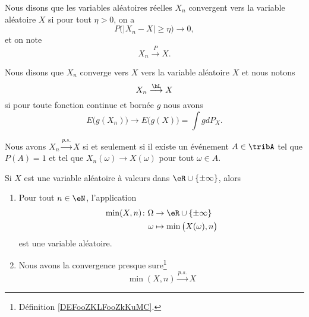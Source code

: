 \begin{definition}
	Nous disons que les variables aléatoires réelles \( X_n\) convergent  vers la variable aléatoire \( X\) si pour tout \( \eta>0\), on a
	\begin{equation}
		P\big( | X_n-X |\geq \eta \big)\to 0,
	\end{equation}
	et on note
	\begin{equation}
		X_n\stackrel{P}{\longrightarrow}X.
	\end{equation}
\end{definition}

\begin{definition}
	Nous disons que \( X_n\) converge vers \( X\)  vers la variable aléatoire \( X\) et nous notons
	\begin{equation}
		X_n\stackrel{\hL}{\longrightarrow}X
	\end{equation}
	si pour toute fonction continue et bornée \( g\) nous avons
	\begin{equation}
		E\big( g(X_n) \big)\to E\big( g(X) \big)=\int gdP_X.
	\end{equation}
\end{definition}

\begin{lemma}       \label{LEMooADHZooGCxVvn}
	Nous avons \( X_n\stackrel{p.s.}{\longrightarrow}X\) si et seulement si il existe un événement \( A\in\tribA\) tel que \( P(A)=1\) et tel que \( X_n(\omega)\to X(\omega)\) pour tout \( \omega\in A\).
\end{lemma}

\begin{lemma}       \label{LEMooNTNIooKbLwgX}
    Si \( X\) est une variable aléatoire à valeurs dans \( \eR\cup\{ \pm\infty \}\), alors
    \begin{enumerate}
        \item
            Pour tout \( n\in \eN\), l'application
            \begin{equation}
                \begin{aligned}
                    \min(X,n)\colon \Omega&\to \eR\cup\{ \pm\infty \} \\
                    \omega&\mapsto \min\big( X(\omega),n \big) 
                \end{aligned}
            \end{equation}
            est une variable aléatoire.
        \item
            Nous avons la convergence presque sure\footnote{Définition \ref{DEFooZKLFooZkKuMC}.}
	\begin{equation}
        \min(X,n)\stackrel{p.s.}{\longrightarrow}X
	\end{equation}
    \end{enumerate}
\end{lemma}

